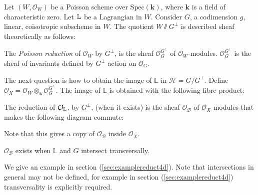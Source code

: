     Let \((W,\mathcal{O}_W)\) be a Poisson scheme over \( \mathrm{Spec}(\mathbf{k})\), where \( \mathbf{k}\) is a field of characteristic zero. Let \( \mathbb{L}\) be a Lagrangian in \(W\). Consider \(G\), a codimension \(g\), linear, coisotropic subscheme in \(W\).
    The quotient \(W \sslash G^{\perp} \) is described sheaf theoretically as follows:
    \begin{defn}
    The \emph{Poisson reduction} of \( \mathcal{O}_W\) by \(G^{\perp}\), is the sheaf \( \mathcal{O}_G^{G^{\perp}}\) of \( \mathcal{O}_W\)-modules. \( \mathcal{O}_G^{G^{\perp}}\) is the sheaf of invariants defined by \(G^{\perp}\) action on \( \mathcal{O}_G\).
    \end{defn}
    
    The next question is how to obtain the image of \( \mathbb{L}\) in \( \mathcal{H} = G/G^{\perp}\). Define \( \mathcal{O}_X = \mathcal{O}_W \otimes_{\mathbf{k}} \mathcal{O}_G^{G^\perp}\).
    The image of \( \mathbb{L}\) is obtained with the following fibre product:
    
    \begin{defn}
    The reduction of \( \mathcal{O}_{\mathbb{L}} \), by \( G^{\perp}\), (when it exists) is the sheaf \( \mathcal{O}_\mathcal{B}\) of \( \mathcal{O}_X\)-modules that makes the following diagram commute:
    \begin{center}
    \end{center}
    \end{defn}
    Note that this gives a copy of \( \mathcal{O}_{\mathcal{B}}\) inside \( \mathcal{O}_X\).
    
    
    \begin{prop} \( \mathcal{O}_{\mathcal{B}}\) exists when \( \mathbb{L}\) and \(G\) intersect transversally. 
    \end{prop}
    We give an example in section (\ref{sec:examplereduct4d}).  Note that intersections in general may not be defined, for example in section (\ref{sec:examplereduct4d}) transversality is explicitly required.
    
